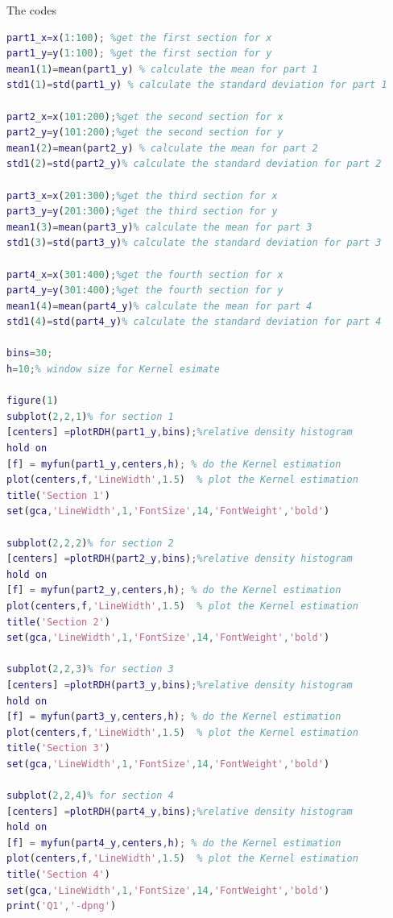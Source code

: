 \documentclass[
	12pt, %
]{fphw}
\begin{document}
The codes


\begin{lstlisting}[language=Matlab,escapeinside=``]
part1_x=x(1:100); %get the first section for x
part1_y=y(1:100); %get the first section for y
mean1(1)=mean(part1_y) % calculate the mean for part 1
std1(1)=std(part1_y) % calculate the standard deviation for part 1

part2_x=x(101:200);%get the second section for x
part2_y=y(101:200);%get the second section for y
mean1(2)=mean(part2_y) % calculate the mean for part 2
std1(2)=std(part2_y)% calculate the standard deviation for part 2

part3_x=x(201:300);%get the third section for x
part3_y=y(201:300);%get the third section for y
mean1(3)=mean(part3_y)% calculate the mean for part 3
std1(3)=std(part3_y)% calculate the standard deviation for part 3

part4_x=x(301:400);%get the fourth section for x
part4_y=y(301:400);%get the fourth section for y
mean1(4)=mean(part4_y)% calculate the mean for part 4
std1(4)=std(part4_y)% calculate the standard deviation for part 4

bins=30;
h=10;% window size for Kernel esimate

figure(1)
subplot(2,2,1)% for section 1
[centers] =plotRDH(part1_y,bins);%relative density histogram
hold on
[f] = myfun(part1_y,centers,h); % do the Kernel estimation 
plot(centers,f,'LineWidth',1.5)  % plot the Kernel estimation 
title('Section 1')
set(gca,'LineWidth',1,'FontSize',14,'FontWeight','bold')

subplot(2,2,2)% for section 2
[centers] =plotRDH(part2_y,bins);%relative density histogram
hold on
[f] = myfun(part2_y,centers,h); % do the Kernel estimation 
plot(centers,f,'LineWidth',1.5)  % plot the Kernel estimation 
title('Section 2')
set(gca,'LineWidth',1,'FontSize',14,'FontWeight','bold')

subplot(2,2,3)% for section 3
[centers] =plotRDH(part3_y,bins);%relative density histogram
hold on
[f] = myfun(part3_y,centers,h); % do the Kernel estimation 
plot(centers,f,'LineWidth',1.5)  % plot the Kernel estimation 
title('Section 3')
set(gca,'LineWidth',1,'FontSize',14,'FontWeight','bold')

subplot(2,2,4)% for section 4
[centers] =plotRDH(part4_y,bins);%relative density histogram
hold on
[f] = myfun(part4_y,centers,h); % do the Kernel estimation 
plot(centers,f,'LineWidth',1.5)  % plot the Kernel estimation 
title('Section 4')
set(gca,'LineWidth',1,'FontSize',14,'FontWeight','bold')
print('Q1','-dpng')


\end{lstlisting}
\end{document}
